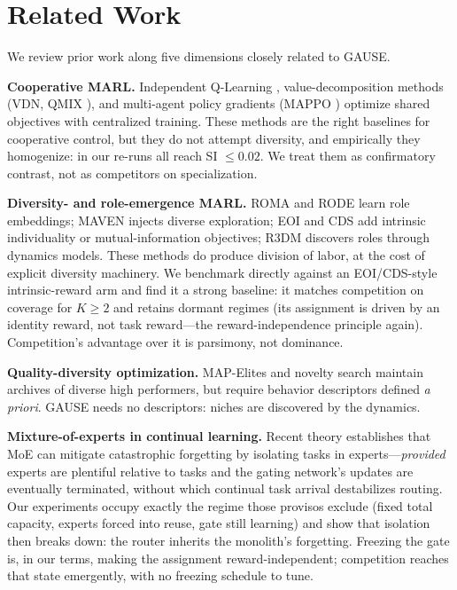 \documentclass[10pt]{article}
\begin{document}
\section{Related Work}

We review prior work along five dimensions closely related to GAUSE.

\textbf{Cooperative MARL.} Independent Q-Learning \cite{tan1993multi},
value-decomposition methods (VDN, QMIX \cite{rashid2018qmix}), and multi-agent
policy gradients (MAPPO \cite{yu2022surprising}) optimize shared objectives
with centralized training. These methods are the right baselines for cooperative
control, but they do not attempt diversity, and empirically they homogenize: in
our re-runs all reach SI $\le 0.02$. We treat them as confirmatory contrast, not
as competitors on specialization.

\textbf{Diversity- and role-emergence MARL.} ROMA \cite{wang2020roma} and RODE
\cite{wang2021rode} learn role embeddings; MAVEN \cite{mahajan2019maven}
injects diverse exploration; EOI \cite{jiang2021eoi} and CDS \cite{li2021cds}
add intrinsic individuality or mutual-information objectives; R3DM
\cite{goel2025r3dm} discovers roles through dynamics models. These methods do
produce division of labor, at the cost of explicit diversity machinery. We
benchmark directly against an EOI/CDS-style intrinsic-reward arm and find it a
strong baseline: it matches competition on coverage for $K\ge2$ and retains
dormant regimes (its assignment is driven by an identity reward, not task
reward---the reward-independence principle again). Competition's advantage over
it is parsimony, not dominance.

\textbf{Quality-diversity optimization.} MAP-Elites
\cite{mouret2015illuminating} and novelty search \cite{lehman2011evolving}
maintain archives of diverse high performers, but require behavior descriptors
defined \emph{a priori}. GAUSE needs no descriptors: niches are
discovered by the dynamics.

\textbf{Mixture-of-experts in continual learning.} Recent theory
\cite{li2024moecl} establishes that MoE can mitigate catastrophic forgetting
\cite{french1999catastrophic, parisi2019continual} by isolating tasks in
experts---\emph{provided} experts are plentiful relative to tasks and the gating
network's updates are eventually terminated, without which continual task
arrival destabilizes routing. Our experiments occupy exactly the regime those
provisos exclude (fixed total capacity, experts forced into reuse, gate still
learning) and show that isolation then breaks down: the router inherits the
monolith's forgetting. Freezing the gate is, in our terms, making the assignment
reward-independent; competition reaches that state emergently, with no freezing
schedule to tune.
\end{document}

